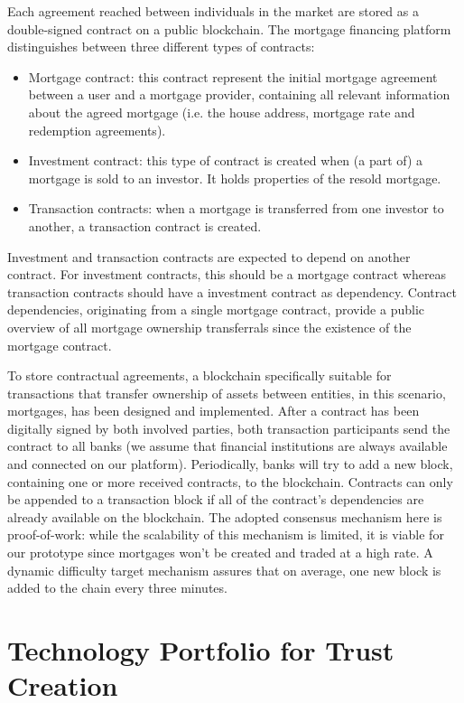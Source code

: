 \documentclass[USenglish]{article}
\begin{document}
Each agreement reached between individuals in the market are stored as a double-signed contract on a public blockchain.
The mortgage financing platform distinguishes between three different types of contracts:
\begin{itemize}
	\item Mortgage contract: this contract represent the initial mortgage agreement between a user and a mortgage provider, containing all relevant information about the agreed mortgage (i.e. the house address, mortgage rate and redemption agreements).
	\item Investment contract: this type of contract is created when (a part of) a mortgage is sold to an investor. It holds properties of the resold mortgage.
	\item Transaction contracts: when a mortgage is transferred from one investor to another, a transaction contract is created.
\end{itemize}
Investment and transaction contracts are expected to depend on another contract.
For investment contracts, this should be a mortgage contract whereas transaction contracts should have a investment contract as dependency.
Contract dependencies, originating from a single mortgage contract, provide a public overview of all mortgage ownership transferrals since the existence of the mortgage contract.

To store contractual agreements, a blockchain specifically suitable for transactions that transfer ownership of assets between entities, in this scenario, mortgages, has been designed and implemented.
After a contract has been digitally signed by both involved parties, both transaction participants send the contract to all banks (we assume that financial institutions are always available and connected on our platform).
Periodically, banks will try to add a new block, containing one or more received contracts, to the blockchain.
Contracts can only be appended to a transaction block if all of the contract's dependencies are already available on the blockchain.
The adopted consensus mechanism here is proof-of-work: while the scalability of this mechanism is limited, it is viable for our prototype since mortgages won't be created and traded at a high rate.
A dynamic difficulty target mechanism assures that on average, one new block is added to the chain every three minutes.

\section{Technology Portfolio for Trust Creation}
\end{document}
